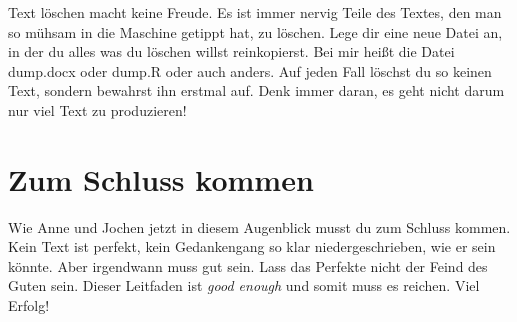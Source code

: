 \documentclass[
  letterpaper,
]{scrbook}
\begin{document}
Text löschen macht keine Freude. Es ist immer nervig Teile des Textes,
den man so mühsam in die Maschine getippt hat, zu löschen. Lege dir eine
neue Datei an, in der du alles was du löschen willst reinkopierst. Bei
mir heißt die Datei dump.docx oder dump.R oder auch anders. Auf jeden
Fall löschst du so keinen Text, sondern bewahrst ihn erstmal auf. Denk
immer daran, es geht nicht darum nur viel Text zu produzieren!

\hypertarget{zum-schluss-kommen}{%
\section{Zum Schluss kommen}\label{zum-schluss-kommen}}

Wie Anne und Jochen
jetzt in diesem Augenblick musst du zum Schluss kommen. Kein Text ist
perfekt, kein Gedankengang so klar niedergeschrieben, wie er sein
könnte. Aber irgendwann muss gut sein. Lass das Perfekte nicht der Feind
des Guten sein. Dieser Leitfaden ist \emph{good enough} und somit muss
es reichen. Viel Erfolg!
\end{document}
